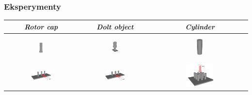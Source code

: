 \documentclass[12pt,a4paper,portrait]{beamer}
\begin{document}
\begin{frame}
\frametitle{Eksperymenty}
\centering
\begin{tabular}{|c|c|c|}
\hline
\emph{Rotor cap} & \emph{Dolt object} & \emph{Cylinder} \\ \hline
\includegraphics[width=0.3\textwidth]{images/rotorcap} &
\includegraphics[width=0.3\textwidth]{images/dolt} &
\includegraphics[width=0.3\textwidth]{images/cylinder} \\ \hline
\includegraphics[width=0.3\textwidth]{images/rotor_task} &
\includegraphics[width=0.3\textwidth]{images/dolt_task} &
\includegraphics[width=0.3\textwidth]{images/cyl_task} \\ \hline
\end{tabular}
\end{frame}
\end{document}
